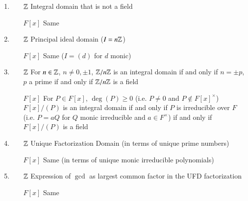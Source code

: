 \documentclass[12pt, a4paper, oneside, openright, titlepage]{book}
\begin{document}
\begin{rmk}[Parallels]
        \leavevmode
        \begin{enumerate}
                \item \begin{enumerate}
                                \item[$\mathbb Z$] Integral domain that is not a field
                                \item[${F[x]}$] Same
                \end{enumerate}
                \item \begin{enumerate}
                                \item[$\mathbb Z$] Principal ideal domain ($I = n\mathbb Z$)
                                \item[${F[x]}$] Same ($I = (d)$ for $d$ monic)
                \end{enumerate}
                \item \begin{enumerate}
                                \item[$\mathbb Z$] For $n \in \mathbb Z$, $n \neq 0, \pm 1$, $\mathbb Z/n\mathbb Z$ is an integral domain if and only if $n = \pm p$, $p$ a prime if and only if $\mathbb Z/n\mathbb Z$ is a field 
                                \item[${F[x]}$] For $P \in F[x]$, $\deg(P) \geq 0$ (i.e. $P \neq 0$ and $P \notin F[x]^{\times}$) $F[x]/(P)$ is an integral domain if and only if $P$ is irreducible over $F$ (i.e. $P = aQ$ for $Q$ monic irreducible and $a \in F^{\times}$) if and only if $F[x]/(P)$ is a field
                \end{enumerate}
                \item \begin{enumerate}
                                \item[$\mathbb Z$] Unique Factorization Domain (in terms of unique prime numbers) 
                                \item[${F[x]}$] Same (in terms of unique monic irreducible polynomials)
                \end{enumerate}
                \item \begin{enumerate}
                                \item[$\mathbb Z$] Expression of $\gcd$ as largest common factor in the UFD factorization
                                \item[${F[x]}$] Same
                \end{enumerate}
        \end{enumerate}
\end{rmk}
\end{document}
